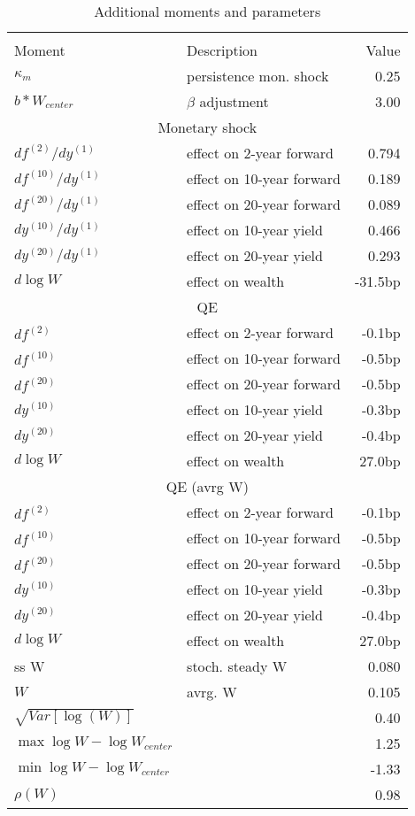 \begin{table}[htbp]\centering  
 \bgroup  
 \def\arraystretch{1.25}\caption{Additional moments and parameters} 
\begin{tabular}{llr} 
\hline\hline 
\multicolumn{3}{c}{} \\ 
Moment & Description & Value  \\ 
$\kappa_m$ & persistence mon. shock  & 0.25   \\ 
$b*W_{center}$ & $\beta$ adjustment  & 3.00   \\ 
\hline 
\multicolumn{3}{c}{Monetary shock} \\ 
$df^{(2)}/dy^{(1)} $ & effect on 2-year forward  & 0.794 \\ 
$df^{(10)}/dy^{(1)} $ & effect on 10-year forward  & 0.189 \\ 
$df^{(20)}/dy^{(1)} $ & effect on 20-year forward  & 0.089 \\ 
$dy^{(10)}/dy^{(1)} $ & effect on 10-year yield  & 0.466 \\ 
$dy^{(20)}/dy^{(1)} $ & effect on 20-year yield  & 0.293 \\ 
$d\log W$ & effect on wealth  & -31.5bp \\ 
\hline 
\multicolumn{3}{c}{QE} \\ 
$df^{(2)}$ & effect on 2-year forward  & -0.1bp \\ 
$df^{(10)}$ & effect on 10-year forward  & -0.5bp \\ 
$df^{(20)}$ & effect on 20-year forward  & -0.5bp \\ 
$dy^{(10)}$ & effect on 10-year yield  & -0.3bp \\ 
$dy^{(20)}$ & effect on 20-year yield  & -0.4bp \\ 
$d\log W$ & effect on wealth  & 27.0bp \\ 
\hline 
\multicolumn{3}{c}{QE (avrg W)} \\ 
$df^{(2)} $ & effect on 2-year forward  & -0.1bp \\ 
$df^{(10)} $ & effect on 10-year forward  & -0.5bp \\ 
$df^{(20)} $ & effect on 20-year forward  & -0.5bp \\ 
$dy^{(10)} $ & effect on 10-year yield  & -0.3bp \\ 
$dy^{(20)} $ & effect on 20-year yield  & -0.4bp \\ 
$d\log W$ & effect on wealth  & 27.0bp \\ 
\hline 
ss W & stoch. steady W & 0.080   \\ 
$W$ & avrg. W & 0.105   \\ 
$\sqrt{Var[\log(W)]}$ &  & 0.40   \\ 
$\max \log W - \log W_{center} $ &  & 1.25   \\ 
$\min \log W - \log W_{center} $ &  & -1.33   \\ 
$\rho(W)$ &  & 0.98   \\ 
\hline 
\hline\hline 
\end{tabular} 
 \egroup 
\end{table} 
